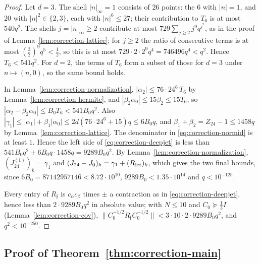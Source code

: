 \begin{proof}
Let $d=3$. The shell $|n|_\infty=1$ consists of $26$ points: the $6$ with $|n|=1$, and $20$ with $|n|^2\in\{2,3\}$, each with $|n|^6\le27$; their contribution to $T_6$ is at most $540q^2$. The shells $j=|n|_\infty\ge2$ contribute at most $729\sum_{j\ge2}j^9q^{j^2}$, as in the proof of Lemma~\ref{lem:correction-lattice}; for $j\ge2$ the ratio of consecutive terms is at most $(\frac32)^9q^5<\frac12$, so this is at most $729\cdot2\cdot2^9q^4=746496q^4<q^2$. Hence $T_6<541q^2$. For $d=2$, the terms of $T_6$ form a subset of those for $d=3$ under $n\mapsto(n,0)$, so the same bound holds.

In Lemma~\ref{lem:correction-normalization}, $|\alpha_2|\le76\cdot24^6\,T_6$ by Lemma~\ref{lem:correction-hermite}, and $|\beta_2\alpha_0|\le15\beta_2\le15T_6$, so $|\alpha_2-\beta_2\alpha_0|\le B_0T_6<541B_0q^2$. Also $|\gamma_1|\le|\alpha_1|+\beta_1|\alpha_0|\le2d(76\cdot24^6+15)q\le6B_0q$, and $\beta_1+\beta_2=Z_{24}-1\le1458q$ by Lemma~\ref{lem:correction-lattice}. The denominator in \eqref{eq:correction-normid} is at least $1$. Hence the left side of \eqref{eq:correction-deepjet} is less than $541B_0q^2+6B_0q\cdot1458q=9289B_0q^2$. By Lemma~\ref{lem:correction-normalization}, $(J^{(1)}_{24})_k=\gamma_1$ and $(J_{24}-J_0)_k=\gamma_1+(R_{\rm jet})_k$, which gives the two final bounds, since $6B_0=87142957146<8.72\cdot10^{10}$, $9289B_0<1.35\cdot10^{14}$ and $q<10^{-125}$.

Every entry of $R_{\mathfrak f}$ is $c_\alpha c_\beta$ times $\pm$ a contraction as in \eqref{eq:correction-deepjet}, hence less than $2\cdot9289B_0q^2$ in absolute value; with $N\le10$ and $C_0\succcurlyeq\frac13I$ (Lemma~\ref{lem:correction-cov}), $\|C_0^{-1/2}R_{\mathfrak f}C_0^{-1/2}\|<3\cdot10\cdot2\cdot9289B_0q^2$, and $q^2<10^{-250}$.
\end{proof}

\subsection{Proof of Theorem~\ref{thm:correction-main}}

